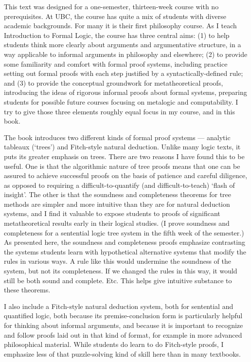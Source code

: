 This text was designed for a one-semester, thirteen-week course with no prerequisites. At UBC, the course has quite a mix of students with diverse academic backgrounds. For many it is their first philosophy course. As I teach Introduction to Formal Logic, the course has three central aims: (1) to help students think more clearly about arguments and argumentative structure, in a way applicable to informal arguments in philosophy and elsewhere; (2) to provide some familiarity and comfort with formal proof systems, including practice setting out formal proofs with each step justified by a syntactically-defined rule; and (3) to provide the conceptual groundwork for metatheoretical proofs, introducing the ideas of rigorous informal proofs about formal systems, preparing students for possible future courses focusing on metalogic and computability. I try to give those three elements roughly equal focus in my course, and in this book.

The book introduces two different kinds of formal proof systems --- analytic tableaux (`trees') and Fitch-style natural deduction. Unlike many logic texts, it puts its greater emphasis on trees. There are two reasons I have found this to be useful. One is that the algorithmic nature of tree proofs means that one can be assured to achieve successful proofs on the basis of patience and careful diligence, as opposed to requiring a difficult-to-quantify (and difficult-to-teach) `flash of insight'. The other is that the soundness and completeness theorems for tree methods are simpler and more intuitive than they are for natural deduction systems, and I find it valuable to expose students to proofs of significant metatheoretical results early in their logical studies. (I prove soundness and completeness for a sentential logic tree system in the fifth week of the semester.) As presented here, the soundness and completeness proofs emphasize contrasting the systems students learn with hypothetical alternative systems that modify the rules in various ways. A rule like this would undermine the soundness of the system, but not its completeness. If we changed the rules in this way, it would still be both sound and complete. Etc. This helps give intuitive substance to these theorems.

I also include a Fitch-style natural deduction system, both for sentential and quantified logic, both because its premise-conclusion form is particularly helpful for thinking about informal arguments, and because it is important to recognize and follow proofs laid out in that kind of format, for example in more advanced philosophical material. While students do learn to do Fitch-style proofs, I emphasize less of that puzzle-solving kind of skill here than in many textbooks.

